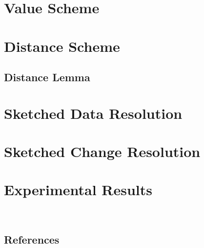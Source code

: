 \documentclass[10pt,a4paper]{article}
\begin{document}
\begin{multicols*}{2}
\section{Value Scheme}

\section{Distance Scheme}

\subsection{Distance Lemma}

\section{Sketched Data Resolution}

\section{Sketched Change Resolution}

\section{Experimental Results}

\ 

\begin{center}
\section*{References}
\end{center}

\end{multicols*}
\end{document}
